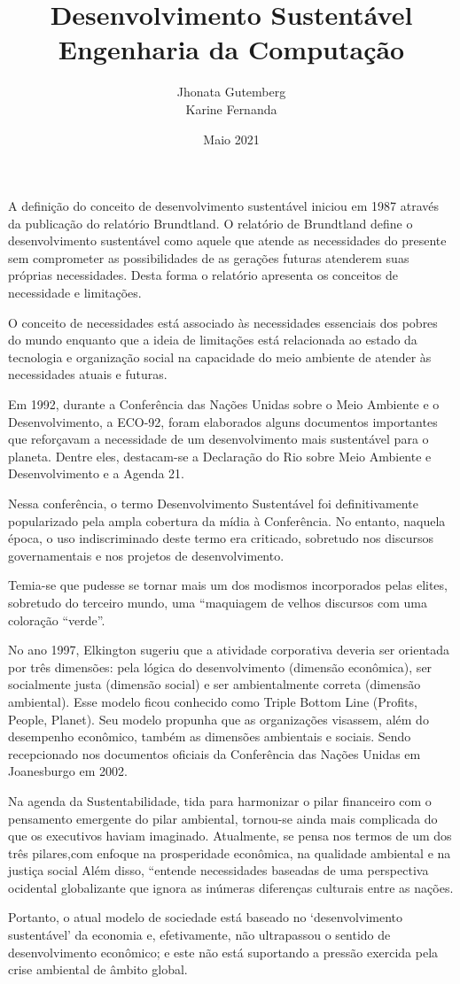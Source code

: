 \documentclass[a4paper, 12pt]{article}
\title{
    Desenvolvimento Sustentável \\
    \large Engenharia da Computação
}
\author{
    Jhonata Gutemberg
    \\ Karine Fernanda
}
\date{Maio 2021}
\begin{document}
    \maketitle
    \par A definição do conceito de desenvolvimento sustentável iniciou em 1987 através da publicação do relatório Brundtland. O relatório de Brundtland define o desenvolvimento sustentável como aquele que atende as necessidades do presente sem comprometer as possibilidades de as gerações futuras atenderem suas próprias necessidades. Desta forma o relatório apresenta os conceitos de necessidade e limitações.
    \par O conceito de necessidades está associado às necessidades essenciais dos pobres do mundo enquanto que a ideia de limitações está relacionada ao estado da tecnologia e organização social na capacidade do meio ambiente de atender às necessidades atuais e futuras.
    \par Em 1992, durante a Conferência das Nações Unidas sobre o Meio Ambiente e o Desenvolvimento, a ECO-92, foram elaborados alguns documentos importantes que 
    reforçavam a necessidade de um desenvolvimento mais sustentável para o planeta. Dentre eles, destacam-se a Declaração do Rio sobre Meio Ambiente e Desenvolvimento e a Agenda 21.
    \par Nessa conferência, o termo Desenvolvimento Sustentável foi definitivamente popularizado pela ampla cobertura da mídia à Conferência. No entanto, naquela época, o uso indiscriminado deste termo era criticado, sobretudo nos discursos governamentais e nos projetos de desenvolvimento.
    \par Temia-se que pudesse se tornar mais um dos modismos incorporados pelas elites, sobretudo do terceiro mundo, uma “maquiagem de velhos discursos com uma coloração “verde”.
    \par No ano 1997, Elkington sugeriu que a atividade corporativa deveria ser orientada por 
    três dimensões: pela lógica do desenvolvimento (dimensão econômica), ser socialmente justa (dimensão social) e ser ambientalmente correta (dimensão ambiental). Esse modelo ficou conhecido como Triple Bottom Line (Profits, People, Planet). Seu modelo propunha que as organizações visassem, além do desempenho econômico, também as dimensões ambientais e sociais. Sendo recepcionado nos documentos oficiais da Conferência das Nações Unidas em Joanesburgo em 2002.
    \par Na agenda da Sustentabilidade, tida para harmonizar o pilar financeiro com o 
    pensamento emergente do pilar ambiental, tornou-se ainda mais complicada do que os 
    executivos haviam imaginado. Atualmente, se pensa nos termos de um dos três pilares,com enfoque na prosperidade econômica, na qualidade ambiental e na justiça social Além disso, “entende necessidades baseadas de uma perspectiva ocidental globalizante que ignora as inúmeras diferenças culturais entre as nações.
    \par Portanto, o atual modelo de sociedade está baseado no ‘desenvolvimento 
    sustentável’ da economia e, efetivamente, não ultrapassou o sentido de desenvolvimento econômico; e este não está suportando a pressão exercida pela crise ambiental de âmbito global.
\end{document}
